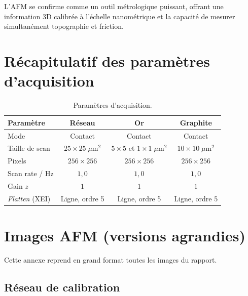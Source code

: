 \documentclass[a4paper,10pt]{article}
\begin{document}
L'AFM se confirme comme un outil métrologique puissant, offrant une information 3D
calibrée à l'échelle nanométrique et la capacité de mesurer simultanément topographie
et friction.

\appendix

\section{Récapitulatif des paramètres d'acquisition}

\begin{table}[H]
\centering
\caption{Paramètres d'acquisition.}
\label{tab:params}
\footnotesize
\begin{tabular}{lccc}
\toprule
Paramètre & Réseau & Or & Graphite \\
\midrule
Mode                     & Contact         & Contact                 & Contact \\
Taille de scan           & $25\times25\;\mu$m$^2$ & $5\times5$ et $1\times1\;\mu$m$^2$ & $10\times10\;\mu$m$^2$ \\
Pixels                   & $256\times256$  & $256\times256$          & $256\times256$ \\
Scan rate / Hz           & $1{,}0$         & $1{,}0$                 & $1{,}0$ \\
Gain $z$                 & $1$             & $1$                     & $1$ \\
\textit{Flatten} (XEI)   & Ligne, ordre 5  & Ligne, ordre 5          & Ligne, ordre 5 \\
\bottomrule
\end{tabular}
\end{table}

\section{Images AFM (versions agrandies)}
\label{ann:images}

Cette annexe reprend en grand format toutes les images du rapport.

\subsection{Réseau de calibration}
\end{document}
